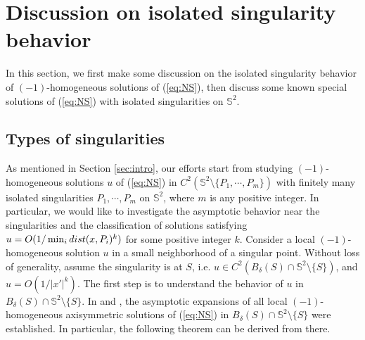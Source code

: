 \documentclass[12pt]{article}
\begin{document}
\section{Discussion on isolated singularity behavior}\label{sec:3}

In this section, we first make some discussion on the isolated singularity behavior of $(-1)$-homogeneous solutions of (\ref{eq:NS}), then discuss some known special solutions of (\ref{eq:NS}) with isolated singularities on $\mathbb{S}^2$. 

\subsection{Types of singularities}

As mentioned in Section \ref{sec:intro}, our efforts start from studying $(-1)$-homogeneous solutions $u$ of (\ref{eq:NS}) in $C^2(\mathbb{S}^2\setminus\{P_1, \cdots, P_m\})$ with finitely many isolated singularities $P_1, \cdots, P_m$ on $\mathbb{S}^2$, where $m$ is any positive integer. In particular, we would like to investigate the asymptotic behavior near the singularities and the classification of solutions satisfying $u=O(1/\min_i {\rm dist}(x, P_i)^k)$ for some positive integer $k$. Consider a local $(-1)$-homogeneous solution $u$ in a small neighborhood of a singular point. Without loss of generality, assume the singularity is at $S$, i.e. $u\in C^2(B_{\delta}(S)\cap \mathbb{S}^2\setminus\{S\})$, and $u=O(1/|x'|^k)$. The first step is to understand the behavior of $u$ in $B_{\delta}(S)\cap \mathbb{S}^2\setminus\{S\}$. In \cite{LLY1} and \cite{LLY2}, the asymptotic expansions of all local $(-1)$-homogeneous axisymmetric solutions of (\ref{eq:NS}) in $B_{\delta}(S)\cap \mathbb{S}^2\setminus\{S\}$ were established. In particular, the following theorem can be derived from there. 
 
\end{document}
